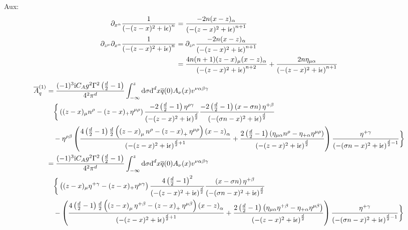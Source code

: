 Aux:
\begin{align}
	\partial_{x^\alpha} \frac{1}{ \left(-(z-x)^2+\text{i}\epsilon\right)^{n}}
	&=
	\frac{-2n(x-z)_\alpha}{ \left(-(z-x)^2+\text{i}\epsilon\right)^{n+1}}
	\\
	\partial_{z^\mu}\partial_{x^\alpha} \frac{1}{ \left(-(z-x)^2+\text{i}\epsilon\right)^{n}}
	&=
	\partial_{z^\mu}\frac{-2n(x-z)_\alpha}{ \left(-(z-x)^2+\text{i}\epsilon\right)^{n+1}}
	\\
	&=
	\frac{4n(n+1)(z-x)_\mu(x-z)_\alpha}{ \left(-(z-x)^2+\text{i}\epsilon\right)^{n+2}} + 
	\frac{2n\eta_{\mu\alpha}}{ \left(-(z-x)^2+\text{i}\epsilon\right)^{n+1}}
\end{align}

\begin{align}
	\overline A_q^{(1)}
	&=
	\frac{(-1)^3 \text{i} C_A g^2 \Gamma^2\left( \frac{d}{2} -1\right)}{4^2\pi^{d}} \int_{-\infty}^z \text{d} \sigma \text{d} ^d x  \overline q(0) A_\nu (x) v^{\nu\alpha\beta\gamma}
	\\&~~~
	\bigg\{ \left( (z-x)_\mu n^\rho - (z-x)_+ \eta^{\mu \rho} \right) \frac{-2\left(\frac{d}{2}-1\right)\eta^{\rho \gamma}}{ \left(-(z-x)^2+\text{i}\epsilon\right)^{\frac{d}{2}}} \frac{-2\left(\frac{d}{2}-1\right)\left( x- \sigma n \right)\eta^{+\beta}}{ \left(-(\sigma n -x)^2+\text{i}\epsilon\right)^{\frac{d}{2}}} 
	\\&~~~
	- \eta^{\rho \beta} \left(\frac{4 \left(\frac{d}{2}-1\right)\frac{d}{2}\left(\left(z-x\right)_\mu n^\rho -\left(z-x\right)_+ \eta^{\mu \rho}  \right)\left(x-z\right)_\alpha}{ \left(-(z-x)^2+\text{i}\epsilon\right)^{\frac{d}{2}+1}} + \frac{2\left(\frac{d}{2}-1\right)\left(\eta_{\mu\alpha}n^\rho-\eta_{+\alpha}\eta^{\mu \rho}\right)}{\left(-(z -x)^2+\text{i}\epsilon\right)^{\frac{d}{2}}} \right)\frac{\eta^{+ \gamma}}{ \left(-(\sigma n -x)^2+\text{i}\epsilon\right)^{\frac{d}{2}-1}} \bigg\}
	\\
	&=
	\frac{(-1)^3 \text{i} C_A g^2 \Gamma^2\left( \frac{d}{2} -1\right)}{4^2\pi^{d}} \int_{-\infty}^z \text{d} \sigma \text{d} ^d x  \overline q(0) A_\nu (x) v^{\nu\alpha\beta\gamma}
	\\&~~~
	\bigg\{ \left( (z-x)_\mu \eta^{+ \gamma} - (z-x)_+ \eta^{\mu \gamma} \right) \frac{4\left(\frac{d}{2}-1\right)^2}{ \left(-(z-x)^2+\text{i}\epsilon\right)^{\frac{d}{2}}} \frac{\left( x- \sigma n \right)\eta^{+\beta}}{ \left(-(\sigma n -x)^2+\text{i}\epsilon\right)^{\frac{d}{2}}} 
	\\&~~~
	-  \left(\frac{4 \left(\frac{d}{2}-1\right)\frac{d}{2}\left(\left(z-x\right)_\mu \eta^{+ \beta} -\left(z-x\right)_+ \eta^{\mu \beta}  \right)\left(x-z\right)_\alpha}{ \left(-(z-x)^2+\text{i}\epsilon\right)^{\frac{d}{2}+1}} + \frac{2\left(\frac{d}{2}-1\right)\left(\eta_{\mu\alpha}\eta^{+ \beta}-\eta_{+\alpha}\eta^{\mu \beta}\right)}{\left(-(z -x)^2+\text{i}\epsilon\right)^{\frac{d}{2}}} \right)\frac{\eta^{+ \gamma}}{ \left(-(\sigma n -x)^2+\text{i}\epsilon\right)^{\frac{d}{2}-1}} \bigg\}
\end{align}

